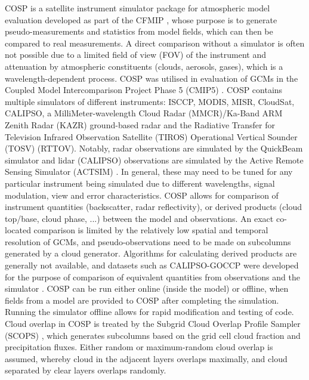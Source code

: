 COSP \citep{bodas-salcedo2011} is a satellite instrument simulator package
for atmospheric model evaluation developed as part of
the CFMIP \citep{bony2011},
whose purpose is to generate pseudo-measurements and statistics from model fields, which can
then be compared to real
measurements. A direct comparison without a simulator is often not possible
due to a limited field of view (FOV) of the instrument and attenuation by atmospheric
constituents (clouds, aerosols, gases), which is a wavelength-dependent process.
COSP was utilised in evaluation of GCMs in the
Coupled Model Intercomparison Project Phase 5 (CMIP5) \citep{taylor2011}.
COSP contains multiple simulators of different instruments:
ISCCP, MODIS, MISR, CloudSat, CALIPSO, a MilliMeter-wavelength Cloud Radar
(MMCR)/Ka-Band ARM Zenith Radar (KAZR) ground-based radar
and the Radiative Transfer for Television Infrared Observation Satellite (TIROS)
Operational Vertical Sounder (TOSV) (RTTOV).
Notably, radar observations are simulated by the QuickBeam simulator
\citep{haynes2007} and lidar (CALIPSO) observations are simulated
by the Active Remote Sensing Simulator (ACTSIM) \citep{chepfer2008}. In general, these may need
to be tuned for any particular instrument being simulated due to different
wavelengths, signal modulation, view and error characteristics.
COSP allows for comparison of instrument quantities
(backscatter, radar reflectivity), or derived products
(cloud top/base, cloud phase, ...) between the model and observations.
An exact co-located comparison is limited by the relatively low spatial and
temporal resolution
of GCMs, and pseudo-observations need to be made on subcolumns generated by
a cloud generator. Algorithms for calculating derived products are generally not
available, and datasets such as CALIPSO-GOCCP were developed for the purpose
of comparison of equivalent quantities from observations and the simulator
\citep{chepfer2010}.
COSP can be run either online (inside the model) or offline,
when fields from a model are provided to COSP after completing the simulation.
Running the simulator offline allows for rapid modification
and testing of code. Cloud overlap in COSP is treated by the Subgrid Cloud Overlap Profile Sampler
(SCOPS) \citep{webb2001}, which generates subcolumns based on the grid cell
cloud fraction and precipitation fluxes. Either random or maximum-random cloud overlap
\citep{geleyn1979,ritter1992} is assumed,
whereby cloud in the adjacent layers overlaps maximally, and cloud separated
by clear layers overlaps randomly.

